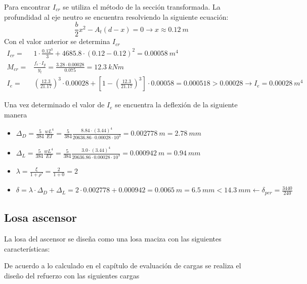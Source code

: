 \documentclass[12pt]{article}
\begin{document}
Para encontrar $I_{cr}$ se utiliza el método de la sección transformada. La profundidad al eje neutro se encuentra resolviendo la siguiente ecuación:
\begin{equation*}
    \frac{b}{2}x^2 -A_{t}(d-x)=0 \longrightarrow x \approx 0.12~m
\end{equation*}
Con el valor anterior se determina $I_{cr}$\\
\begin{align*}
    I_{cr}= &1 \cdot \frac{0.12^3}{3}+4685.8\cdot(0.12-0.12)^2=0.00058~m^4 \\
    M_{cr}=&\frac{f_{r}\cdot I_{g}}{y_{t}}= \frac{3.28 \cdot 0.00028}{0.075}=12.3~kNm\\
    I_{e}= & \left(\frac{12.3}{21.17}\right)^3 \cdot 0.00028 + \left[1- \left(\frac{12.3}{21.17}\right)^3\right]\cdot 0.00058 = 0.000518 > 0.00028 \longrightarrow  I_{e}=0.00028~m^4
\end{align*}

Una vez determinado el valor de $I_{e}$ se encuentra la deflexión de la siguiente manera

\begin{itemize}
    \item $\Delta_{D} = \frac{5}{384}\frac{wL^4}{EI}=\frac{5}{384}\frac{8.84 \cdot (3.44)^4}{20636.86\cdot 0.00028 \cdot 10^3}=0.002778~m = 2.78~mm$
    \item $\Delta_{L} = \frac{5}{384}\frac{wL^4}{EI}=\frac{5}{384}\frac{3.0 \cdot (3.44)^4}{20636.86\cdot 0.00028 \cdot 10^3}=0.000942~m = 0.94~mm$
    \item $ \lambda =\frac{\xi}{1+\rho'}=\frac{2}{1+0}=2$
     \item $\delta = \lambda\cdot \Delta_{D}+\Delta_{L}=2\cdot0.002778 + 0.000942 = 0.0065~m = 6.5~mm < 14.3 ~mm \longleftarrow \delta_{per}=\frac{3440}{240}$
\end{itemize}


\subsection{Losa ascensor}

La losa del ascensor se diseña como una losa maciza con las siguientes características:





De acuerdo a lo calculado en el capítulo de evaluación de cargas se realiza el diseño del refuerzo con las siguientes cargas
\end{document}
